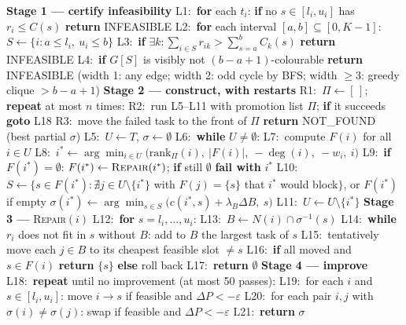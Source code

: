 \begin{algorithm}[h]
\caption{SSD-R$(T, G, r, C, w, \tau)$}
\begin{algorithmic}
\State \textbf{Stage 1 --- certify infeasibility}
\State L1:\ \textbf{for} each $t_i$: \textbf{if} no $s\in[l_i,u_i]$ has $r_i\le C(s)$ \textbf{return} INFEASIBLE 
\State L2:\ \textbf{for} each interval $[a,b]\subseteq[0,K-1]$: $S\gets\{i: a\le l_i,\ u_i\le b\}$
\State L3:\ \quad \textbf{if} $\exists k: \sum_{i\in S} r_{ik} > \sum_{s=a}^{b} C_k(s)$ \textbf{return} INFEASIBLE 
\State L4:\ \quad \textbf{if} $G[S]$ is visibly not $(b{-}a{+}1)$-colourable \textbf{return} INFEASIBLE
\Statex \hspace{2.6em}\small(width 1: any edge; width 2: odd cycle by BFS; width $\ge3$: greedy clique $>b{-}a{+}1$)\normalsize
\State \textbf{Stage 2 --- construct, with restarts}
\State R1:\ $\Pi\gets[\,]$; \textbf{repeat} at most $n$ times: 
\State R2:\ \quad run L5--L11 with promotion list $\Pi$; \textbf{if} it succeeds \textbf{goto} L18
\State R3:\ \quad move the failed task to the front of $\Pi$
\State \quad \textbf{return} NOT\_FOUND (best partial $\sigma$)
\State L5:\ \quad $U\gets T$, $\sigma\gets\emptyset$
\State L6:\ \quad \textbf{while} $U\neq\emptyset$:
\State L7:\ \qquad compute $F(i)$ for all $i\in U$
\State L8:\ \qquad $i^\ast\gets\arg\min_{i\in U}\big(\text{rank}_\Pi(i),\ |F(i)|,\ -\deg(i),\ -w_i,\ i\big)$
\State L9:\ \qquad \textbf{if} $F(i^\ast)=\emptyset$: $F(i^\ast)\gets\textsc{Repair}(i^\ast)$; \textbf{if} still $\emptyset$ \textbf{fail with} $i^\ast$
\State L10:\ \qquad $S\gets\{s\in F(i^\ast): \nexists j\in U{\setminus}\{i^\ast\}$ with $F(j)=\{s\}$ that $i^\ast$ would block$\}$, or $F(i^\ast)$ if empty
\Statex \hspace{3.6em} $\sigma(i^\ast)\gets\arg\min_{s\in S}\big(c(i^\ast,s)+\lambda_B\Delta B,\ s\big)$ 
\State L11:\ \qquad $U\gets U\setminus\{i^\ast\}$
\State \textbf{Stage 3 --- }\textsc{Repair}$(i)$
\State L12:\ \textbf{for} $s=l_i,\dots,u_i$:
\State L13:\ \quad $B\gets N(i)\cap\sigma^{-1}(s)$ 
\State L14:\ \quad \textbf{while} $r_i$ does not fit in $s$ without $B$: add to $B$ the largest task of $s$ 
\State L15:\ \quad tentatively move each $j\in B$ to its cheapest feasible slot $\neq s$
\State L16:\ \quad \textbf{if} all moved and $s\in F(i)$ \textbf{return} $\{s\}$ \textbf{else} roll back
\State L17:\ \textbf{return} $\emptyset$
\State \textbf{Stage 4 --- improve}
\State L18:\ \textbf{repeat} until no improvement (at most 50 passes):
\State L19:\ \quad for each $i$ and $s\in[l_i,u_i]$: move $i\to s$ if feasible and $\Delta P<-\varepsilon$
\State L20:\ \quad for each pair $i,j$ with $\sigma(i)\ne\sigma(j)$: swap if feasible and $\Delta P<-\varepsilon$
\State L21:\ \textbf{return} $\sigma$
\end{algorithmic}
\end{algorithm}

